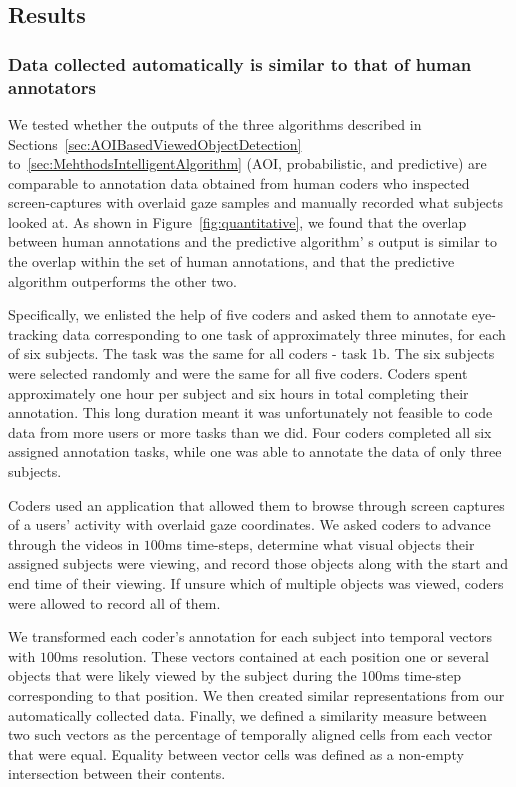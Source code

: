 \subsection{Results}
\subsubsection{Data collected automatically is similar to that of human annotators}
\label{sec:EvalResults}


We tested whether the outputs of the three algorithms described in Sections~\ref{sec:AOIBasedViewedObjectDetection} to~\ref{sec:MehthodsIntelligentAlgorithm} (AOI, probabilistic, and predictive) are comparable to annotation data obtained from human coders who inspected screen-captures with overlaid gaze samples and manually recorded what subjects looked at. As shown in Figure~\ref{fig:quantitative}, we found that the overlap between human annotations and the predictive algorithm' s output is similar to the overlap within the set of human annotations, and that the predictive algorithm outperforms the other two. 

Specifically, we enlisted the help of five coders and asked them to annotate eye-tracking data corresponding to one task of approximately three minutes, for each of six subjects.  The task was the same for all coders - task 1b. The six subjects were selected randomly and were the same for all five coders. Coders spent approximately one hour per subject and six hours in total completing their annotation. This long duration meant it was unfortunately not feasible to code data from more users or more tasks than we did. Four coders completed all six assigned annotation tasks, while one was able to annotate the data of only three subjects. 

Coders used an application that allowed them to browse through screen captures of a users' activity with overlaid gaze coordinates. We asked coders to advance through the videos in $100$ms time-steps, determine what visual objects their assigned subjects were viewing, and record those objects along with the start and end time of their viewing. If unsure which of multiple objects was viewed, coders were allowed to record all of them.  

We transformed each coder's annotation for each subject into temporal vectors with $100$ms resolution. These vectors contained at each position one or several objects that were likely viewed by the subject during the $100$ms time-step corresponding to that position. We then created similar representations from our automatically collected data. Finally, we defined a similarity measure between two such vectors as the percentage of temporally aligned cells from each vector that were equal. Equality between vector cells was defined as a non-empty intersection between their contents.  

